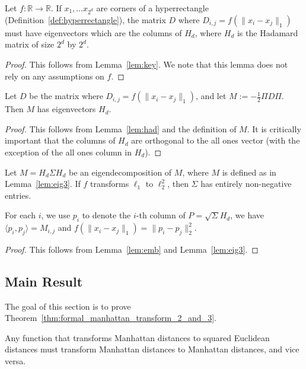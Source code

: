 \begin{lemma}\label{lem:had}
Let $f:\mathbb{R}\rightarrow \mathbb{R}$. If $x_1, \ldots x_{2^d}$ are corners of a hyperrectangle (Definition~\ref{def:hyperrectangle}),
  the matrix $D$ where $D_{i,j} = f(\|x_i-x_j\|_1)$  must have
 eigenvectors which are the columns of $H_d$, where $H_d$ is the
  Hadamard matrix of size $2^d$ by $2^d$.
\end{lemma}
 \begin{proof} 
   This follows from Lemma~\ref{lem:key}.
 We note that this lemma does not rely on any assumptions on $f$.
 \end{proof}



 \begin{lemma}\label{lem:eig3} Let $D$ be the matrix where $D_{i,j} =
   f(\|x_i - x_j\|_1)$, and let $M:= -\frac{1}{2} \Pi D \Pi$. Then $M$ has eigenvectors $H_d$.
\end{lemma}
\begin{proof} This follows from Lemma~\ref{lem:had} and the definition
of $M$. It is critically important that the columns of $H_d$ are
orthogonal to the all ones vector (with the exception of the all ones
  column in $H_d$).
\end{proof}
\begin{lemma}\label{lem:p}
 Let $M = H_d \Sigma H_d$ be an eigendecomposition of
 $M$, where $M$ is defined as in Lemma~\ref{lem:eig3}. If $f$ transforms
  $\ell_1$ to $\ell_2^2$,  then $\Sigma$ has entirely non-negative
  entries.

For each $i$, we use  $p_i$ to denote the $i$-th column of $P = \sqrt{\Sigma} H_d$, we have
 $\langle p_i, p_j \rangle = M_{i,j}$ and $f(\|x_i - x_j\|_1) =
 \|p_i-p_j\|_2^2$.
 \end{lemma}
 \begin{proof} This follows from Lemma~\ref{lem:emb} and
   Lemma~\ref{lem:eig3}.
 \end{proof}


\subsection{Main Result}\label{sec:manhattan_transform23:main}

The goal of this section is to prove Theorem~\ref{thm:formal_manhattan_transform_2_and_3}.
\begin{theorem} \label{thm:formal_manhattan_transform_2_and_3} Any function that transforms Manhattan distances to squared
Euclidean distances must transform Manhattan distances to Manhattan distances, and vice versa. 
\end{theorem}

